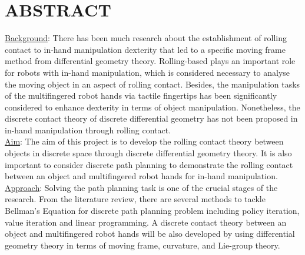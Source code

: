 
\section{ABSTRACT}
\uline{Background}: There has been much research about the establishment of rolling contact to in-hand manipulation dexterity that led to a specific moving frame method from differential geometry theory. Rolling-based plays an important role for robots with in-hand manipulation, which is considered necessary to analyse the moving object in an aspect of rolling contact. Besides, the manipulation tasks of the multifingered robot hands via tactile fingertips has been significantly considered to enhance dexterity in terms of object manipulation. Nonetheless, the discrete contact theory of discrete differential geometry has not been proposed in in-hand manipulation through rolling contact.  \\

\noindent\uline{Aim}: The aim of this project is to develop the rolling contact theory between objects in discrete space through discrete differential geometry theory. It is also important to consider discrete path planning to demonstrate the rolling contact between an object and multifingered robot hands for in-hand manipulation.\\





\noindent\uline{Approach}: Solving the path planning task is one of the crucial stages of the research. From the literature review, there are several methods to tackle Bellman's Equation for discrete path planning problem including policy iteration, value iteration and linear programming. A discrete contact theory between an object and multifingered robot hands will be also developed by using differential geometry theory in terms of moving frame, curvature, and Lie-group theory.\\


